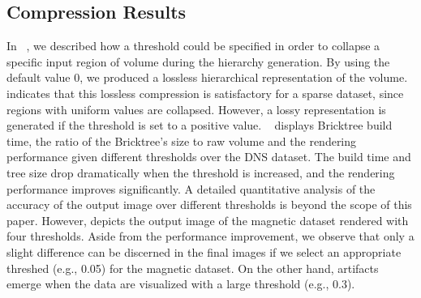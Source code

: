 


\subsection{Compression Results}
In ~, we described how a threshold could be specified 
in order to collapse a specific input region of volume during the hierarchy generation.
By using the default value 0, we produced a lossless hierarchical representation of
the volume.  indicates that this lossless compression
is satisfactory for a sparse dataset, since regions with uniform values
are collapsed. However, a lossy representation is generated if the threshold is
set to a positive value. ~ displays Bricktree build time,
the ratio of the Bricktree's size to raw volume and the rendering performance given different 
thresholds over the DNS dataset. The build time and tree size drop dramatically when 
the threshold is increased, and the rendering performance improves significantly. 
A detailed quantitative analysis of the accuracy of the output image over different 
thresholds is beyond the scope of this paper.
However, 
depicts the output image of the magnetic dataset rendered with four thresholds. Aside from the performance improvement, 
we observe that only a slight difference can be discerned in the final images if we select an appropriate threshed (e.g., 0.05) for the magnetic dataset.
On the other hand, artifacts emerge when the data are visualized with a large threshold (e.g., 0.3).

